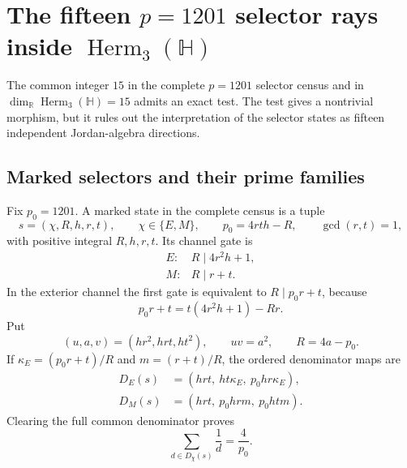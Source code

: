 \section{The fifteen $p=1201$ selector rays inside
$\operatorname{Herm}_3(\mathbb H)$}
\label{sec:fifteen-selector-jordan}

The common integer $15$ in the complete $p=1201$ selector census and in
$\dim_{\mathbb R}\operatorname{Herm}_3(\mathbb H)=15$ admits an exact test.
The test gives a nontrivial morphism, but it rules out the interpretation of
the selector states as fifteen independent Jordan-algebra directions.

\subsection{Marked selectors and their prime families}

Fix $p_0=1201$.  A marked state in the complete census is a tuple
\[
 s=(\chi,R,h,r,t),\qquad \chi\in\{E,M\},\qquad
 p_0=4rth-R,\qquad \gcd(r,t)=1,
\]
with positive integral $R,h,r,t$.  Its channel gate is
\begin{equation}
 \begin{array}{ll}
 E:&R\mid4r^2h+1,\\
 M:&R\mid r+t.
 \end{array}
 \label{eq:fifteen-gates}
\end{equation}
In the exterior channel the first gate is equivalent to $R\mid p_0r+t$,
because
\[
 p_0r+t=t(4r^2h+1)-Rr.
\]
Put
\begin{equation}
(u,a,v)=(hr^2,hrt,ht^2),\qquad uv=a^2,\qquad R=4a-p_0.
 \label{eq:fifteen-uav}
\end{equation}
If $\kappa_E=(p_0r+t)/R$ and $m=(r+t)/R$, the ordered denominator
maps are
\begin{align}
 D_E(s)&=(hrt,\ ht\kappa_E,\ p_0hr\kappa_E),\label{eq:fifteen-DE}\\
 D_M(s)&=(hrt,\ p_0hrm,\ p_0htm).\label{eq:fifteen-DM}
\end{align}
Clearing the full common denominator proves
\[
 \sum_{d\in D_\chi(s)}\frac1d=\frac4{p_0}.
\]

